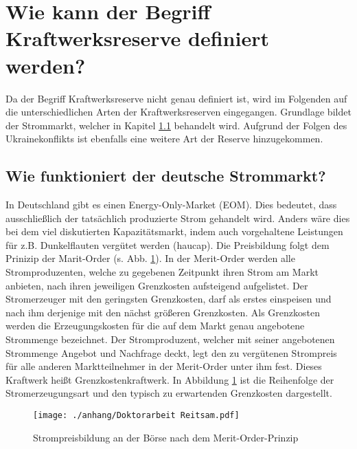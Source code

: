 \section{Wie kann der Begriff Kraftwerksreserve definiert werden?}

	Da der Begriff Kraftwerksreserve nicht genau definiert ist, wird im Folgenden auf die unterschiedlichen Arten der Kraftwerksreserven eingegangen.
	Grundlage bildet der Strommarkt, welcher in Kapitel \ref{sect: Wie funktioniert der deutsche Strommarkt?} behandelt wird.
	Aufgrund der Folgen des Ukrainekonflikts ist ebenfalls eine weitere Art der Reserve hinzugekommen.

	\subsection{Wie funktioniert der deutsche Strommarkt?} \label{sect: Wie funktioniert der deutsche Strommarkt?}
	
		In Deutschland gibt es einen Energy-Only-Market (EOM).
		Dies bedeutet, dass ausschließlich der tatsächlich produzierte Strom gehandelt wird.
		Anders wäre dies bei dem viel diskutierten Kapazitätsmarkt, indem auch vorgehaltene Leistungen für z.B. Dunkelflauten vergütet werden (haucap).
		Die Preisbildung folgt dem Prinizip der Marit-Order (s. Abb. \ref{Abb. Strompreisbildung Merit Order}).
		In der Merit-Order werden alle Stromproduzenten, welche zu gegebenen Zeitpunkt ihren Strom am Markt anbieten, nach ihren jeweiligen Grenzkosten aufsteigend aufgelistet.
		Der Stromerzeuger mit den geringsten Grenzkosten, darf als erstes einspeisen und nach ihm derjenige mit den nächst größeren Grenzkosten.
		Als Grenzkosten werden die Erzeugungskosten für die auf dem Markt genau angebotene Strommenge bezeichnet.
		Der Stromproduzent, welcher mit seiner angebotenen Strommenge Angebot und Nachfrage deckt, legt den zu vergütenen Strompreis für alle anderen Marktteilnehmer in der Merit-Order unter ihm fest.
		Dieses Kraftwerk heißt Grenzkostenkraftwerk.
		In Abbildung \ref{Abb. Strompreisbildung Merit Order} ist die Reihenfolge der Stromerzeugungsart und den typisch zu erwartenden Grenzkosten dargestellt. \\
		
		\begin{figure} [H]
			\centering
			\label{Abb. Strompreisbildung Merit Order}
			\texttt{[image: ./anhang/Doktorarbeit Reitsam.pdf]}
			\caption{Strompreisbildung an der Börse nach dem Merit-Order-Prinzip \cite{Doktorarbeit_Reitsam}}
		\end{figure}
		
